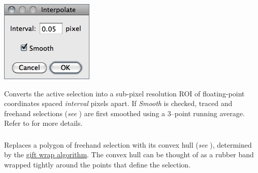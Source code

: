 \begin{minipage}[c][1\totalheight][t]{0.265\columnwidth}%
\includegraphics[scale=0.55]{images/Interpolate}%
\end{minipage}%
\begin{minipage}[c][1\totalheight][t]{0.735\columnwidth}%
Converts
the active selection into a sub-pixel resolution ROI of floating-point
coordinates spaced \emph{interval} pixels apart. If \emph{Smooth}
is checked, traced and freehand selections (\emph{see} )
are first smoothed using a 3--point running average. Refer to 
for more details.%
\end{minipage}




\subsubsection{\protect{}\label{sub:Convex-Hull}}

Replaces a polygon of freehand selection with its convex
hull (\emph{see} ), determined by
the \href{http://en.wikipedia.org/wiki/Gift_wrapping_algorithm}{gift wrap algorithm}.
The convex hull can be thought of as a rubber band wrapped tightly
around the points that define the selection.




\subsubsection{\protect{}\label{sub:Make-Inverse}}

